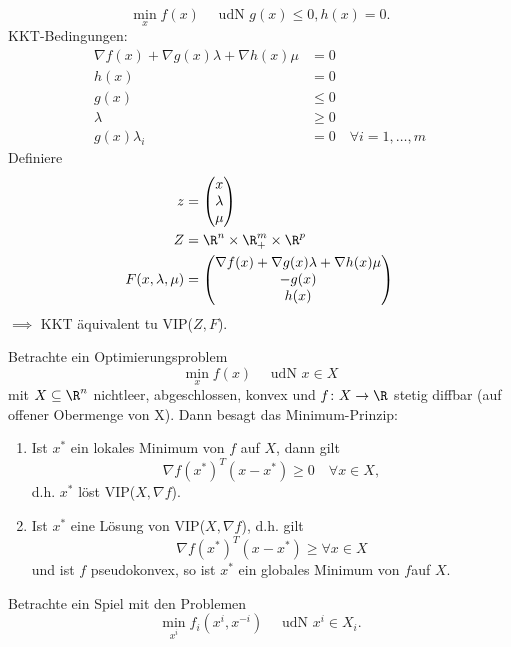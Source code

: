 \begin{beisp}
	\[
		\min\limits_{x}f(x) \quad \text{ udN } g(x)\leq  0, h(x) = 0
	.\] 
	KKT-Bedingungen:
	\begin{align*}
		\nabla f({x}) + \nabla g({x}) \lambda  + \nabla h({x})\mu &= 0 \\
		h({x}) &= 0 \\
		g({x}) &\leq 0 \\
		\lambda &\geq  0 \\
		g({x})\lambda _{i} &= 0 \quad \forall i = 1, \ldots, m
	\end{align*}
	Definiere
	\begin{align*}
		z &= \begin{pmatrix}
	x \\ \lambda \\ \mu 
	\end{pmatrix}
	\\
			Z &= \R^{n} \times \R^{m}_{+} \times \R^{p}
	\\
			F(x, \lambda ,\mu ) &= \begin{pmatrix}
		\nabla f(x) + \nabla g(x)\lambda  + \nabla h(x)\mu  \\
		-g(x) \\
		h(x)
	\end{pmatrix}
	\end{align*}
	$\implies$ KKT äquivalent tu VIP($Z,F$).
\end{beisp}

Betrachte ein Optimierungsproblem
\[
	\min\limits_{x}f(x) \quad \text{ udN }x \in X
\] 
mit $X \subseteq \R^{n}$ nichtleer, abgeschlossen, konvex und $f \colon X \rightarrow \R $ stetig diffbar (auf offener Obermenge von X). Dann besagt das Minimum-Prinzip:
\begin{enumerate}[label=(\alph{enumi})]
	\item Ist ${x}^{*}$ ein lokales Minimum von $f$ auf $X$, dann gilt 
		\[
			\nabla  f({x}^{*})^{T}(x-{x}^{*}) \geq  0 \quad \forall x \in X
		,\] 
		d.h. ${x}^{*}$ löst VIP($X,\nabla f$).
	\item Ist ${x}^{*}$ eine Lösung von VIP($X,\nabla f$), d.h. gilt 
		\[
			\nabla f({x}^{*})^{T}(x-{x}^{*}) \geq  \forall x \in X
		\] 
		und ist $f$ pseudokonvex, so ist ${x}^{*}$ ein globales Minimum von $f$auf $X$.
\end{enumerate}

Betrachte ein Spiel mit den Problemen
\[
	\min\limits_{x^{i}}f_{i}(x^{i},x^{-i}) \quad \text{ udN } x^{i} \in X_{i}
.\] 

